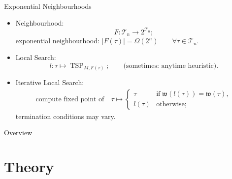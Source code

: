\documentclass[
  size=10pt,
  style=klope,
  paper=screen,
  pauseslide,
  nopagebreaks,
  fleqn
]{powerdot}
\begin{document}
\begin{slide}{Exponential Neighbourhoods}
\begin{itemize}
  \item
  Neighbourhood:
  \begin{equation}
    F: \mathcal{T}_n \to 2^{\mathcal{T}_n};
  \end{equation}
  exponential neighbourhood:
  $\left\vert F(\tau) \right\vert = \Omega(2^n) \qquad \forall \tau \in \mathcal{T}_n$.
  \item
  Local Search:
  \begin{equation}
    l: \tau \mapsto \operatorname{TSP}_{M,F(\tau)};
    \qquad \text{(sometimes: anytime heuristic)}.
  \end{equation}
  \item
  Iterative Local Search:
  \begin{align}
    \text{compute fixed point of}
    \quad
    \tau \mapsto
    \begin{cases}
      \tau \quad & \text{if} \; \mathfrak{w}\left(l\left(\tau\right)\right) = \mathfrak{w}\left(\tau\right),
      \\
      l\left(\tau\right) & \text{otherwise};
    \end{cases}
  \end{align}
  termination conditions may vary.
\end{itemize}
\end{slide}

\begin{slide}[toc=,bm=]{Overview}
\tableofcontents[content=currentsection,type=1]
\end{slide}

\section[template=wideslide]{Theory}
\end{document}
